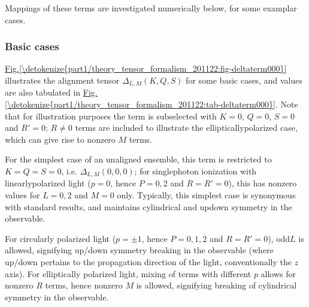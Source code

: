 \documentclass[letterpaper,table,10pt,english]{jupyterBook}
\begin{document}
\sphinxAtStartPar
Mappings of these terms are investigated numerically below, for some examplar cases.


\subsubsection{Basic cases}
\label{\detokenize{part1/theory_tensor_formalism_201122:basic-cases}}\label{\detokenize{part1/theory_tensor_formalism_201122:sec-theory-af-alignment-term-basic}}
\sphinxAtStartPar
\hyperref[\detokenize{part1/theory_tensor_formalism_201122:fig-deltaterm000}]{Fig.\@ \ref{\detokenize{part1/theory_tensor_formalism_201122:fig-deltaterm000}}} illustrates the alignment tensor \(\Delta_{L,M}(K,Q,S)\) for some basic cases, and values are also tabulated in \hyperref[\detokenize{part1/theory_tensor_formalism_201122:tab-deltaterm000}]{Fig.\@ \ref{\detokenize{part1/theory_tensor_formalism_201122:tab-deltaterm000}}}. Note that for illustration purposes the term is subselected with \(K=0\), \(Q=0\), \(S=0\) and \(R'=0\); \(R\neq0\) terms are included to illustrate the elliptically\sphinxhyphen{}polarized case, which can give rise to non\sphinxhyphen{}zero \(M\) terms.

\sphinxAtStartPar
For the simplest case of an unaligned ensemble, this term is restricted to \(K=Q=S=0\), i.e. \(\Delta_{L,M}(0,0,0)\); for single\sphinxhyphen{}photon ionization with linearly\sphinxhyphen{}polarized light (\(p=0\), hence \(P=0,2\) and \(R=R'=0\)), this has non\sphinxhyphen{}zero values for \(L=0,2\) and \(M=0\) only. Typically, this simplest case is synonymous with standard {\hyperref[\detokenize{backmatter/glossary:term-LF}]{}} results, and maintains cylindrical and up\sphinxhyphen{}down symmetry in the observable.

\sphinxAtStartPar
For circularly polarized light (\(p=\pm1\), hence \(P=0,1,2\) and \(R=R'=0\)), odd\sphinxhyphen{}\(L\) is allowed, signifying up/down symmetry breaking in the observable (where up/down pertains to the propagation direction of the light, conventionally the \(z\)\sphinxhyphen{}axis). For elliptically polarized light, mixing of terms with different \(p\) allows for non\sphinxhyphen{}zero \(R\) terms, hence non\sphinxhyphen{}zero \(M\) is allowed, signifying breaking of cylindrical symmetry in the observable.
\end{document}
